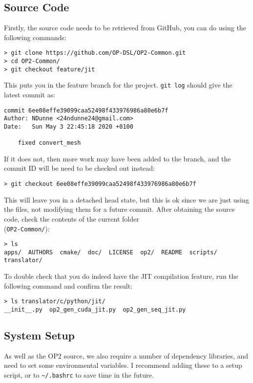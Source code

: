 \subsection{Source Code}
Firstly, the source code needs to be retrieved from GitHub, you can do using the following commands:
\begin{verbatim}
> git clone https://github.com/OP-DSL/OP2-Common.git
> cd OP2-Common/
> git checkout feature/jit
\end{verbatim}
This puts you in the feature branch for the project. \verb|git log| should give the latest commit as:
\begin{lstlisting}
commit 6ee08effe39099caa52498f433976986a80e6b7f
Author: NDunne <24ndunne24@gmail.com>
Date:   Sun May 3 22:45:18 2020 +0100

    fixed convert_mesh
\end{lstlisting}
If it does not, then more work may have been added to the branch, and the commit ID will be need to be checked out instead:
\begin{verbatim}
> git checkout 6ee08effe39099caa52498f433976986a80e6b7f
\end{verbatim}
This will leave you in a detached head state, but this is ok since we are just using the files, not modifying them for a future commit.
\clearpage
\noindent After obtaining the source code, check the contents of the current folder\\ (\verb|OP2-Common/|):
\begin{verbatim}
> ls
apps/  AUTHORS  cmake/  doc/  LICENSE  op2/  README  scripts/  translator/
\end{verbatim}
To double check that you do indeed have the JIT compilation feature, run the following command and confirm the result:
\begin{verbatim}
> ls translator/c/python/jit/
__init__.py  op2_gen_cuda_jit.py  op2_gen_seq_jit.py
\end{verbatim}

\subsection{System Setup}
As well as the OP2 source, we also require a number of dependency libraries, and need to set some environmental variables. I recommend adding these to a setup script, or to \verb|~/.bashrc| to save time in the future.


